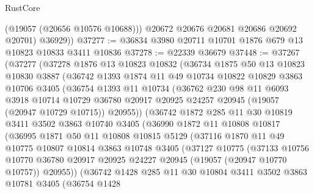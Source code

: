 \begin{lexlean}{RustCore}
\begin{coremodule}
            (@19057 (@20656 @10576 @10688)))
          @20672
          @20676
          @20681
          @20686
          @20692
          @20701)
        @36929))
@37277 := @36834 @3980 @20711 @10701 @1876 @679 @13 @10823 @10833 @3411 @10836
@37278 := @22339 @36679
@37448 := @37267
    (@37277
      (@37278
        @1876
        @13
        @10823
        @10832
        (@36734
          @1875
          @50
          @13
          @10823
          @10830
          @3887
          (@36742
            @1393
            @1874
            @11
            @49
            @10734
            @10822
            @10829
            @3863
            @10706
            @3405
            (@36754
              @1393
              @11
              @10734
              (@36762
                @230
                @98
                @11
                @6093
                @3918
                @10714
                @10729
                @36780
                @20917
                @20925
                @24257
                @20945
                (@19057 (@20947 @10729 @10715))
                @20955))
            (@36742
              @1872
              @285
              @11
              @30
              @10819
              @3411
              @3502
              @3863
              @10740
              @3405
              (@36990
                @1872
                @11
                @10808
                @10817
                (@36995
                  @1871
                  @50
                  @11
                  @10808
                  @10815
                  @5129
                  (@37116
                    @1870
                    @11
                    @49
                    @10775
                    @10807
                    @10814
                    @3863
                    @10748
                    @3405
                    (@37127
                      @10775
                      (@37133
                        @10756
                        @10770
                        @36780
                        @20917
                        @20925
                        @24227
                        @20945
                        (@19057 (@20947 @10770 @10757))
                        @20955))
                    (@36742
                      @1428
                      @285
                      @11
                      @30
                      @10804
                      @3411
                      @3502
                      @3863
                      @10781
                      @3405
                      (@36754
                        @1428

\end{coremodule}
\end{lexlean}
